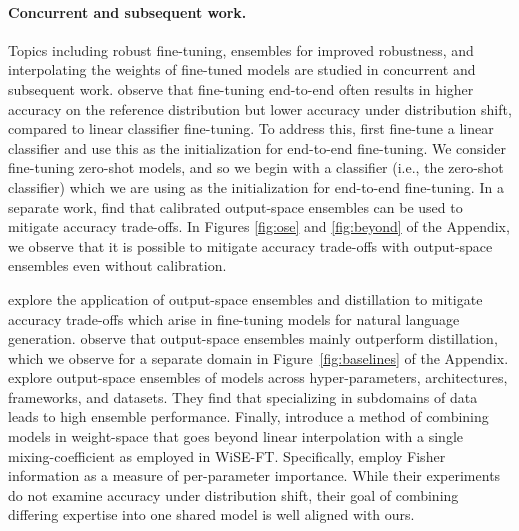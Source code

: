 \paragraph{Concurrent and subsequent work.} Topics including robust fine-tuning, ensembles for improved robustness, and interpolating the weights of fine-tuned models are studied in concurrent and subsequent work. \citet{kumar2021finetuning} observe that fine-tuning end-to-end often results in higher accuracy on the reference distribution but lower accuracy under distribution shift, compared to linear classifier fine-tuning. To address this, \citet{kumar2021finetuning} first fine-tune a linear classifier and use this as the initialization for end-to-end fine-tuning. We consider fine-tuning zero-shot models, and so we begin with a classifier (i.e., the zero-shot classifier) which we are using as the initialization for end-to-end fine-tuning. In a separate work, \citet{kumar2021calibrated} find that calibrated output-space ensembles can be used to mitigate accuracy trade-offs. In Figures \ref{fig:ose} and \ref{fig:beyond} of the Appendix, we observe that it is possible to mitigate accuracy trade-offs with output-space ensembles even without calibration.

\citet{hewitt2021ensembles} explore the application of output-space ensembles and distillation to mitigate accuracy trade-offs which arise in fine-tuning models for natural language generation. \citet{hewitt2021ensembles} observe that output-space ensembles mainly outperform distillation, which we observe for a separate domain in Figure~\ref{fig:baselines} of the Appendix.
\citet{lopes2021no} explore output-space ensembles of models across hyper-parameters, architectures, frameworks, and datasets.
They find that specializing in subdomains of data leads to high ensemble performance. 
Finally, \citet{matena2021merging} introduce a method of combining models in weight-space that goes beyond linear interpolation with a single mixing-coefficient as employed in WiSE-FT.
Specifically, \citet{matena2021merging} employ Fisher information as a measure of per-parameter importance.
While their experiments do not examine accuracy under distribution shift,
their goal of combining differing expertise into one shared model is well aligned with ours.
